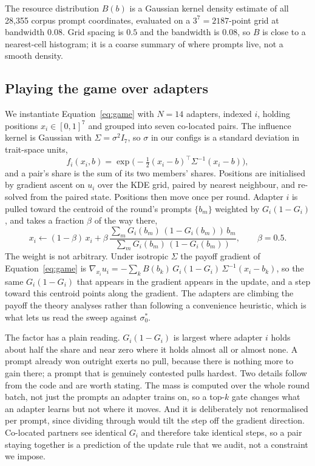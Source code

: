 \documentclass{article}
\begin{document}
The resource distribution $B(b)$ is a Gaussian kernel density estimate of all 28{,}355 corpus prompt
coordinates, evaluated on a $3^7 = 2187$-point grid at bandwidth $0.08$. Grid spacing is $0.5$ and
the bandwidth is $0.08$, so $B$ is close to a nearest-cell histogram; it is a coarse summary of where
prompts live, not a smooth density.

\subsection{Playing the game over adapters}
We instantiate Equation~\ref{eq:game} with $N = 14$ adapters, indexed $i$, holding positions
$x_i \in [0,1]^7$ and grouped into seven co-located pairs. The influence kernel is Gaussian with
$\Sigma = \sigma^2 I_7$, so $\sigma$ in our configs is a standard deviation in trait-space units,
\begin{equation}
f_i(x_i, b) = \exp\!\big(-\tfrac12 (x_i - b)^\top \Sigma^{-1}(x_i - b)\big),
\label{eq:share}
\end{equation}
and a pair's share is the sum of its two members' shares. Positions are initialised by gradient
ascent on $u_i$ over the KDE grid, paired by nearest neighbour, and re-solved from the paired state.
Positions then move once per round. Adapter $i$ is pulled toward the centroid of the round's prompts
$\{b_m\}$ weighted by $G_i(1-G_i)$, and takes a fraction $\beta$ of the way there,
\begin{equation}
x_i \leftarrow (1-\beta)\,x_i + \beta\,\frac{\sum_m G_i(b_m)\,(1 - G_i(b_m))\,b_m}
                                            {\sum_m G_i(b_m)\,(1 - G_i(b_m))}, \qquad \beta = 0.5 .
\label{eq:posupdate}
\end{equation}
The weight is not arbitrary. Under isotropic $\Sigma$ the payoff gradient of Equation~\ref{eq:game}
is $\nabla_{x_i} u_i = -\sum_k B(b_k)\,G_i(1-G_i)\,\Sigma^{-1}(x_i - b_k)$, so the same $G_i(1-G_i)$
that appears in the gradient appears in the update, and a step toward this centroid points along the
gradient. The adapters are climbing the payoff the theory analyses rather than following a
convenience heuristic, which is what lets us read the sweep against $\sigma_0^*$.

The factor has a plain reading. $G_i(1-G_i)$ is largest where adapter $i$ holds about half the share
and near zero where it holds almost all or almost none. A prompt already won outright exerts no pull,
because there is nothing more to gain there; a prompt that is genuinely contested pulls hardest. Two
details follow from the code and are worth stating. The mass is computed over the whole round batch,
not just the prompts an adapter trains on, so a top-$k$ gate changes what an adapter learns but not
where it moves. And it is deliberately not renormalised per prompt, since dividing through would tilt
the step off the gradient direction. Co-located partners see identical $G_i$ and therefore take
identical steps, so a pair staying together is a prediction of the update rule that we audit, not a
constraint we impose.
\end{document}
